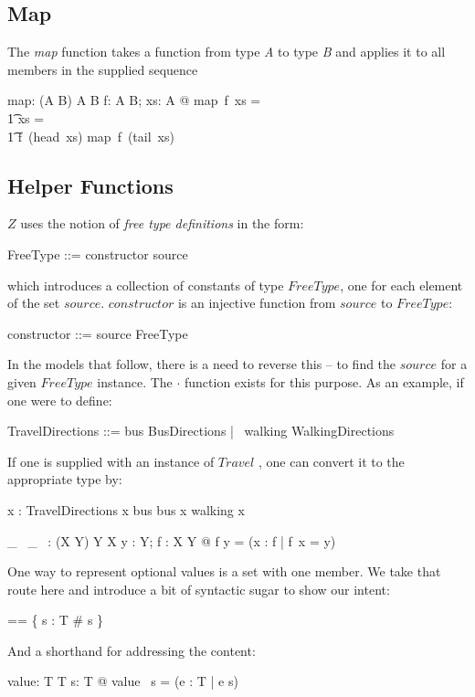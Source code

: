 \documentclass[fuzz]{llncs}
\def\entryFor{\cdot}
\def\zc{\textit}
\begin{document}
\subsection{Map}
The \zc{map} function takes a function from type \zc{A} to type \zc{B} and applies it to
all members in the supplied sequence
\begin{gendef}[A,B]
   map: (A \fun B) \fun \seq A \fun \seq B
\where
   \forall f: A \fun B; xs: \seq A @ map~f~xs = \\
\t1 \IF xs = \langle \rangle \THEN \langle \rangle \\
\t1 \ELSE \langle f~(head~xs) \rangle \cat map~f~(tail~xs)
\end{gendef}

\subsection{Helper Functions}
${Z}$ uses the notion of \textit{free type definitions} in the form: 
\begin{syntax}
FreeType ::= constructor \ldata source \rdata
\end{syntax}
which introduces a collection of constants of type $FreeType$, one for each element of the set $source$.  $constructor$ is an injective function from $source$ to $FreeType$:
\begin{syntax}
constructor ::= source \inj FreeType
\end{syntax}
In the models that follow, there is a need to reverse this -- to find the $source$ for a given $FreeType$ instance. The 
$\entryFor$ function exists for this purpose.  As an example, if one were to define:
\begin{syntax}
TravelDirections ::= bus \ldata BusDirections \rdata | \ walking \ldata WalkingDirections \rdata
\end{syntax}
If one is supplied with an instance of $Travel$ , one can convert it to the appropriate type by:
\begin{syntax}
x : TravelDirections
\where
\IF x \in \ran bus \THEN bus \entryFor x \ELSE walking \entryFor x
\end{syntax}

\begin{gendef}[X, Y]
    \_~  \entryFor \_~   : (X \inj Y) \cross Y \pfun X
   \where %
   \forall y : Y; f : X \inj Y @  f \entryFor y =
   (\mu x : \dom f | f~x = y)
\end{gendef}

One way to represent optional values is a set with one member.  We take that route here 
and introduce a bit of syntactic sugar to show our intent:
\begin{zed} 
  \optional[T] == \{ s : \power T \mid \# s  \} \\
\end{zed}

And a shorthand for addressing the content:
\begin{gendef}[T]
   value: \power T \pfun T
\where
   \forall s: \power T @ value~ s = (\mu e : T | e \in s) 
\end{gendef}



\end{document}
